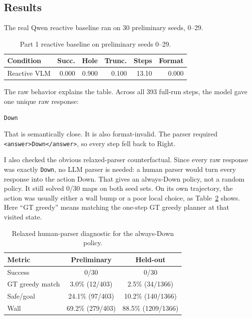 \documentclass{article}
\newcommand{\code}[1]{\texttt{#1}}
\begin{document}
\subsection{Results}

The real Qwen reactive baseline ran on 30 preliminary seeds, 0--29.

\begin{table}[t]
\caption{Part 1 reactive baseline on preliminary seeds 0--29.}
\label{tab:a2}
\centering
\small
\begin{tabular}{lrrrrr}
\toprule
Condition & Succ. & Hole & Trunc. & Steps & Format \\
\midrule
Reactive VLM & 0.000 & 0.900 & 0.100 & 13.10 & 0.000 \\
\bottomrule
\end{tabular}
\end{table}

The raw behavior explains the table. Across all 393 full-run steps, the model gave one unique raw response:

\begin{verbatim}
Down
\end{verbatim}

That is semantically close. It is also format-invalid. The parser required \code{<answer>Down</answer>}, so every step fell back to Right.

I also checked the obvious relaxed-parser counterfactual. Since every raw response was exactly \code{Down}, no LLM parser is needed: a human parser would turn every response into the action Down. That gives an always-Down policy, not a random policy. It still solved 0/30 maps on both seed sets. On its own trajectory, the action was usually either a wall bump or a poor local choice, as Table~\ref{tab:downrelaxed} shows. Here ``GT greedy'' means matching the one-step GT greedy planner at that visited state.

\begin{table}[t]
\caption{Relaxed human-parser diagnostic for the always-Down policy.}
\label{tab:downrelaxed}
\centering
\scriptsize
\setlength{\tabcolsep}{2.5pt}
\begin{tabular}{@{}lcc@{}}
\toprule
Metric & Preliminary & Held-out \\
\midrule
Success & 0/30 & 0/30 \\
GT greedy match & 3.0\% (12/403) & 2.5\% (34/1366) \\
Safe/goal & 24.1\% (97/403) & 10.2\% (140/1366) \\
Wall & 69.2\% (279/403) & 88.5\% (1209/1366) \\
\bottomrule
\end{tabular}
\end{table}
\end{document}
